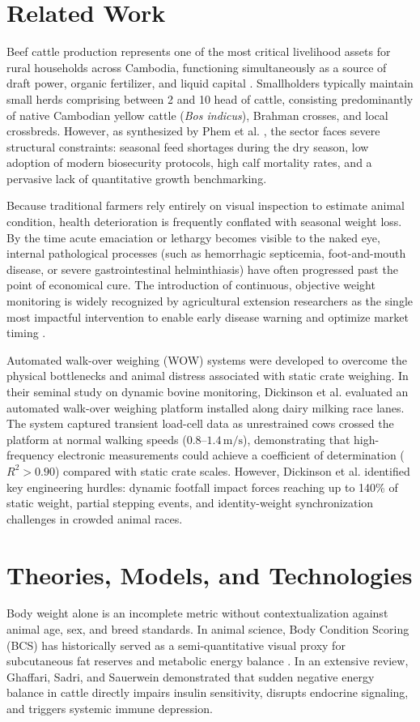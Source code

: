 \documentclass[11pt,a4paper]{report}
\begin{document}
\section{Related Work}
Beef cattle production represents one of the most critical livelihood assets for rural households across Cambodia, functioning simultaneously as a source of draft power, organic fertilizer, and liquid capital \cite{phem2023current}. Smallholders typically maintain small herds comprising between 2 and 10 head of cattle, consisting predominantly of native Cambodian yellow cattle (\textit{Bos indicus}), Brahman crosses, and local crossbreds. However, as synthesized by Phem et al. \cite{phem2023current}, the sector faces severe structural constraints: seasonal feed shortages during the dry season, low adoption of modern biosecurity protocols, high calf mortality rates, and a pervasive lack of quantitative growth benchmarking.

Because traditional farmers rely entirely on visual inspection to estimate animal condition, health deterioration is frequently conflated with seasonal weight loss. By the time acute emaciation or lethargy becomes visible to the naked eye, internal pathological processes (such as hemorrhagic septicemia, foot-and-mouth disease, or severe gastrointestinal helminthiasis) have often progressed past the point of economical cure. The introduction of continuous, objective weight monitoring is widely recognized by agricultural extension researchers as the single most impactful intervention to enable early disease warning and optimize market timing \cite{phem2023current}.

Automated walk-over weighing (WOW) systems were developed to overcome the physical bottlenecks and animal distress associated with static crate weighing. In their seminal study on dynamic bovine monitoring, Dickinson et al. \cite{dickinson2013automated} evaluated an automated walk-over weighing platform installed along dairy milking race lanes. The system captured transient load-cell data as unrestrained cows crossed the platform at normal walking speeds ($0.8\text{--}1.4\,\text{m/s}$), demonstrating that high-frequency electronic measurements could achieve a coefficient of determination ($R^2 > 0.90$) compared with static crate scales. However, Dickinson et al. identified key engineering hurdles: dynamic footfall impact forces reaching up to 140\% of static weight, partial stepping events, and identity-weight synchronization challenges in crowded animal races.

\section{Theories, Models, and Technologies}
Body weight alone is an incomplete metric without contextualization against animal age, sex, and breed standards. In animal science, Body Condition Scoring (BCS) has historically served as a semi-quantitative visual proxy for subcutaneous fat reserves and metabolic energy balance \cite{ghaffari2023invited}. In an extensive review, Ghaffari, Sadri, and Sauerwein \cite{ghaffari2023invited} demonstrated that sudden negative energy balance in cattle directly impairs insulin sensitivity, disrupts endocrine signaling, and triggers systemic immune depression.
\end{document}
